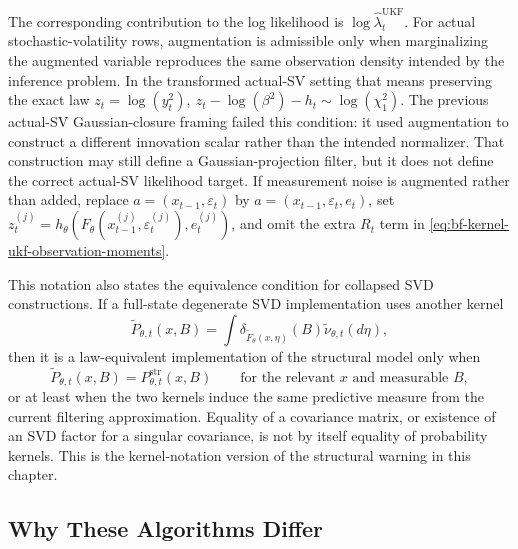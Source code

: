 The corresponding contribution to the log likelihood is
$\log\widehat\lambda_t^{\mathrm{UKF}}$.
For actual stochastic-volatility rows, augmentation is admissible only when
marginalizing the augmented variable reproduces the same observation density
intended by the inference problem.  In the transformed actual-SV setting that
means preserving the exact law
\(
  z_t=\log(y_t^2),
  \ z_t-\log(\beta^2)-h_t\sim\log(\chi_1^2)
\).
The previous actual-SV Gaussian-closure framing failed this condition: it used
augmentation to construct a different innovation scalar rather than the intended
normalizer.  That construction may still define a Gaussian-projection filter, but
it does not define the correct actual-SV likelihood target.
If measurement noise is augmented rather than added, replace
$a=(x_{t-1},\varepsilon_t)$ by
$a=(x_{t-1},\varepsilon_t,e_t)$, set
$z_t^{(j)}=h_\theta(F_\theta(x_{t-1}^{(j)},\varepsilon_t^{(j)}),e_t^{(j)})$,
and omit the extra $R_t$ term in \eqref{eq:bf-kernel-ukf-observation-moments}.

This notation also states the equivalence condition for collapsed SVD
constructions.  If a full-state degenerate SVD implementation uses another
kernel
\[
  \widetilde P_{\theta,t}(x,B)
  =
  \int
  \delta_{\widetilde F_\theta(x,\eta)}(B)
  \widetilde\nu_{\theta,t}(d\eta),
\]
then it is a law-equivalent implementation of the structural model only when
\begin{equation}
  \widetilde P_{\theta,t}(x,B)
  =
  P_{\theta,t}^{\mathrm{str}}(x,B)
  \qquad
  \text{for the relevant }x\text{ and measurable }B,
  \label{eq:bf-kernel-equivalence-condition}
\end{equation}
or at least when the two kernels induce the same predictive measure from the
current filtering approximation.  Equality of a covariance matrix, or existence
of an SVD factor for a singular covariance, is not by itself equality of
probability kernels.  This is the kernel-notation version of the structural
warning in this chapter.

\subsection{Why These Algorithms Differ}
\label{sec:bf-ukf-algorithm-contrast}

